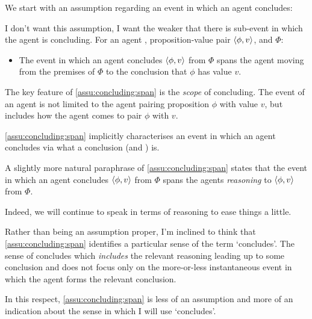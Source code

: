 \begin{note}
  We start with an assumption regarding an event in which an agent concludes:

  \begin{assumption}
    \label{assu:concluding:span}

    {
      \color{red}
      I don't want this assumption, I want the weaker that there is sub-event in which the agent is concluding.
    }
    For an agent \vAgent{}, proposition-value pair \(\langle \phi, v \rangle\), and \poP{} \(\Phi\):

    \begin{itemize}
    \item
      The event in which an agent concludes \(\langle \phi, v \rangle\) from \(\Phi\) spans the agent moving from the premises of \(\Phi\) to the conclusion that \(\phi\) has value \(v\).
    \end{itemize}
    \vspace{-\baselineskip}
  \end{assumption}

  The key feature of \autoref{assu:concluding:span}  is the \emph{scope} of concluding.
  The event of an agent is not limited to the agent pairing proposition \(\phi\) with value \(v\), but includes how the agent comes to pair \(\phi\) with \(v\).

  \autoref{assu:concluding:span} implicitly characterises an event in which an agent concludes via what a conclusion (and \poP{}) is.

  A slightly more natural paraphrase of \autoref{assu:concluding:span} states that the event in which an agent concludes \(\langle \phi, v \rangle\) from \(\Phi\) spans the agents \emph{reasoning} to \(\langle \phi, v \rangle\) from \(\Phi\).

  Indeed, we will continue to speak in terms of reasoning to ease things a little.
\end{note}

\begin{note}
  Rather than being an assumption proper, I'm inclined to think that \autoref{assu:concluding:span} identifies a particular sense of the term `concludes'.
  The sense of concludes which \emph{includes} the relevant reasoning leading up to some conclusion and does not focus only on the more-or-less instantaneous event in which the agent forms the relevant conclusion.

  In this respect, \autoref{assu:concluding:span} is less of an assumption and more of an indication about the sense in which I will use `concludes'.
\end{note}

